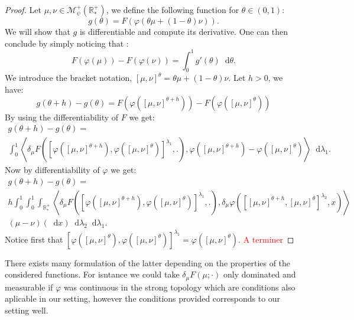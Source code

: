 \documentclass[11pt,a4paper]{article}
\newcommand{\RRP}{\mathbb{R}^+_*}
\newcommand{\MC}{\mathcal{M}}
\newcommand{\red}[1]{\textcolor{red}{#1}}
\newcommand{\brac}[1]{\left\langle#1\right\rangle}
\newcommand{\dd}{\mathop{}\!\mathrm{d}}
\begin{document}
\begin{proof}
    Let $\mu,\nu \in \MC^+_{\psi}(\RRP)$, we define the following function for $\theta \in (0,1)$:
    \[
        g(\theta) =  F\left(\varphi(\theta\mu + (1 - \theta)\nu)\right).
    \]
    We will show that $g$ is differentiable and compute its derivative. One can then conclude by simply noticing that :
    \[ F(\varphi(\mu)) - F(\varphi(\nu)) = \int_0^1 g'(\theta) \dd \theta.\]
    We introduce the bracket notation, $[\mu,\nu]^{\theta } =  \theta\mu + (1 - \theta)\nu$. Let $h > 0$, we have:
    \[ 
    g(\theta + h) - g(\theta) = F\left(\varphi\left([\mu,\nu]^{\theta + h}\right)\right) -F\left(\varphi\left([\mu,\nu]^{\theta}\right)\right)
    \]
    By using the differentiability of $F$ we get:
    \begin{multline*}
    g(\theta + h) - g(\theta) =\\ \int_0^1 \brac{\delta_\mu F\left(\left[\varphi\left([\mu,\nu]^{\theta + h}\right),\varphi\left([\mu,\nu]^{\theta}\right)\right]^{\lambda_1}, . \right),\varphi\left([\mu,\nu]^{\theta + h}\right) - \varphi\left([\mu,\nu]^{\theta}\right)} \dd \lambda_1.
    \end{multline*}
    Now by differentiability of $\varphi$ we get:
    \begin{multline*}
        g(\theta + h) - g(\theta) =\\
        h\int_0^1 \int_0^1\int_{\RRP} \brac{\delta_\mu F\left(\left[\varphi\left([\mu,\nu]^{\theta + h}\right),\varphi\left([\mu,\nu]^{\theta}\right)\right]^{\lambda_1}, . \right),\delta_\mu \varphi\left(\left[ [\mu,\nu]^{\theta + h}, [\mu,\nu]^{\theta }\right]^{\lambda_2} ,x\right)}
        \\
        (\mu-\nu)(\dd x) \dd \lambda_2 \dd \lambda_1. 
    \end{multline*}
    Notice first that \(\left[\varphi\left([\mu,\nu]^{\theta}\right),\varphi\left([\mu,\nu]^{\theta}\right)\right]^{\lambda_1} = \varphi\left([\mu,\nu]^{\theta}\right)\).
    \red{A terminer}
\end{proof}
There exists many formulation of the latter depending on the properties of the considered functions. For isntance we could take $\delta_\mu F(\mu;\cdot)$ only dominated and measurable if $\varphi$ was continuous in the strong topology which are conditions also aplicable in our setting, however the conditions provided corresponds to our setting well.
\end{document}
